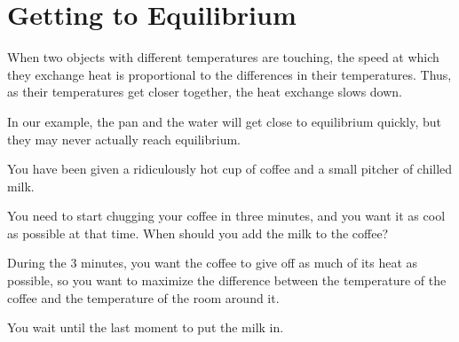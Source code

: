 \section{Getting to Equilibrium}

When two objects with different temperatures are touching, the speed
at which they exchange heat is proportional to the differences in
their temperatures. Thus, as their temperatures get closer together,
the heat exchange slows down.

In our example, the pan and the water will get close to equilibrium
quickly, but they may never actually reach equilibrium.


\begin{Exercise}[title={Cooling Your Coffee}, label=cool_coffee]

  You have been given a ridiculously hot cup of coffee and a small pitcher of chilled milk.

  You need to start chugging your coffee in three minutes, and you want it as cool as possible at that time. When should you add the milk to the coffee?

\end{Exercise}
\begin{Answer}[ref=cool_coffee]

  During the 3 minutes, you want the coffee to give off as much of its
  heat as possible, so you want to maximize the difference between the
  temperature of the coffee and the temperature of the room around
  it.

  You wait until the last moment to put the milk in.

\end{Answer}

